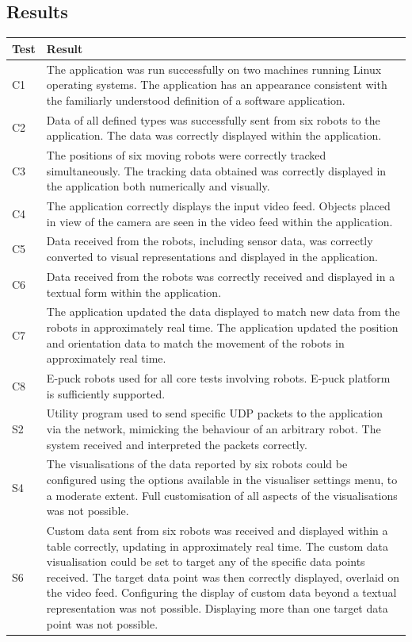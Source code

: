 \subsection{Results}
\begin{longtable}{ l p{10cm} }
 \textbf{Test} & \textbf{Result}\\
 \hline
 C1 & The application was run successfully on two machines running Linux operating systems. The application has an appearance consistent with the familiarly understood definition of a software application.\\\hline
 C2 & Data of all defined types was successfully sent from six robots to the application. The data was correctly displayed within the application.\\\hline
 C3 & The positions of six moving robots were correctly tracked simultaneously. The tracking data obtained was correctly displayed in the application both numerically and visually.\\\hline
 C4 & The application correctly displays the input video feed. Objects placed in view of the camera are seen in the video feed within the application.\\\hline
 C5 & Data received from the robots, including sensor data, was correctly converted to visual representations and displayed in the application.\\\hline
 C6 & Data received from the robots was correctly received and displayed in a textual form within the application.\\\hline
 C7 & The application updated the data displayed to match new data from the robots in approximately real time. The application updated the position and orientation data to match the movement of the robots in approximately real time.\\\hline
 C8 & E-puck robots used for all core tests involving robots. E-puck platform is sufficiently supported.\\\hline
 \hline
 S2 & Utility program used to send specific UDP packets to the application via the network, mimicking the behaviour of an arbitrary robot. The system received and interpreted the packets correctly.\\\hline
 S4 & The visualisations of the data reported by six robots could be configured using the options available in the visualiser settings menu, to a moderate extent. Full customisation of all aspects of the visualisations was not possible.\\ \hline
 S6 & Custom data sent from six robots was received and displayed within a table correctly, updating in approximately real time. The custom data visualisation could be set to target any of the specific data points received. The target data point was then correctly displayed, overlaid on the video feed. Configuring the display of custom data beyond a textual representation was not possible. Displaying more than one target data point was not possible.\\\hline

\end{longtable}
